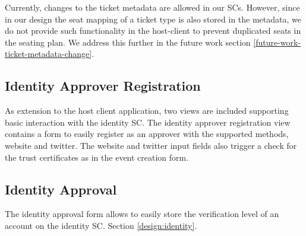 Currently, changes to the ticket metadata are allowed in our SCs. However, since in our design the seat mapping of a ticket type is also stored in the metadata, we do not provide such functionality in the host-client to prevent duplicated seats in the seating plan. We address this further in the future work section \ref{future-work-ticket-metadata-change}.

\subsection{Identity Approver Registration}
As extension to the host client application, two views are included supporting basic interaction with the identity SC. The identity approver registration view contains a form to easily register as an approver with the supported methods, website and twitter. The website and twitter input fields also trigger a check for the trust certificates as in the event creation form.

\subsection{Identity Approval}
The identity approval form allows to easily store the verification level of an account on the identity SC.
Section \ref{design:identity}.


